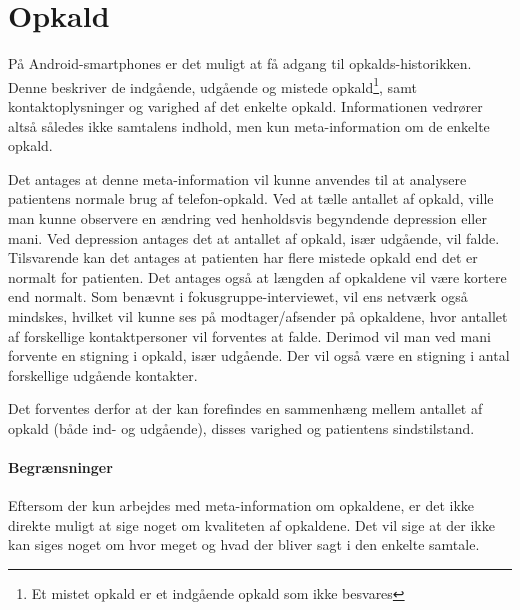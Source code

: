 \section{Opkald}\label{datasamling:opkald}
På Android-smartphones er det muligt at få adgang til opkalds-historikken.
Denne beskriver de indgående, udgående og mistede opkald\footnote{Et mistet opkald er et indgående opkald som ikke besvares}, samt kontaktoplysninger og varighed af det enkelte opkald.
Informationen vedrører altså således ikke samtalens indhold, men kun meta-information om de enkelte opkald.

Det antages at denne meta-information vil kunne anvendes til at analysere patientens normale brug af telefon-opkald.
Ved at tælle antallet af opkald, ville man kunne observere en ændring ved henholdsvis begyndende depression eller mani.
Ved depression antages det at antallet af opkald, især udgående, vil falde.
Tilsvarende kan det antages at patienten har flere mistede opkald end det er normalt for patienten.
Det antages også at længden af opkaldene vil være kortere end normalt.
Som benævnt i fokusgruppe-interviewet, vil ens netværk også mindskes, hvilket vil kunne ses på modtager/afsender på opkaldene, hvor antallet af forskellige kontaktpersoner vil forventes at falde.
Derimod vil man ved mani forvente en stigning i opkald, især udgående.
Der vil også være en stigning i antal forskellige udgående kontakter.

Det forventes derfor at der kan forefindes en sammenhæng mellem antallet af opkald (både ind- og udgående), disses varighed og patientens sindstilstand.

\paragraph{Begrænsninger}
Eftersom der kun arbejdes med meta-information om opkaldene, er det ikke direkte muligt at sige noget om kvaliteten af opkaldene.
Det vil sige at der ikke kan siges noget om hvor meget og hvad der bliver sagt i den enkelte samtale.